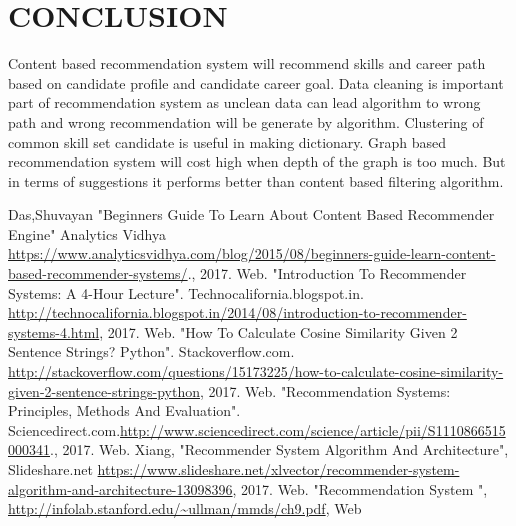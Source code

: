 \documentclass[journal, a4paper]{IEEEtran}
\begin{document}
\section{CONCLUSION}
Content based recommendation system will recommend skills and career path based on candidate profile and candidate career goal. Data cleaning is important part of recommendation system as unclean data can lead algorithm to wrong path and wrong recommendation will be generate by algorithm. Clustering of common skill set candidate is useful in making dictionary. Graph based recommendation system will cost high when depth of the graph is too much. But in terms of suggestions it performs better than content based filtering algorithm.
\begin{thebibliography}{9}
	Das,Shuvayan "Beginners Guide To Learn About Content Based Recommender Engine" Analytics Vidhya \url{https://www.analyticsvidhya.com/blog/2015/08/beginners-guide-learn-content-based-recommender-systems/}., 2017. Web. 
	"Introduction To Recommender Systems: A 4-Hour Lecture". Technocalifornia.blogspot.in. \url{http://technocalifornia.blogspot.in/2014/08/introduction-to-recommender-systems-4.html}, 2017. Web. 	
	"How To Calculate Cosine Similarity Given 2 Sentence Strings? Python". Stackoverflow.com. \url{http://stackoverflow.com/questions/15173225/how-to-calculate-cosine-similarity-given-2-sentence-strings-python}, 2017. Web. 
"Recommendation Systems: Principles, Methods And Evaluation". Sciencedirect.com.\url{http://www.sciencedirect.com/science/article/pii/S1110866515000341}., 2017. Web. 
Xiang, "Recommender System Algorithm And Architecture", Slideshare.net \url{https://www.slideshare.net/xlvector/recommender-system-algorithm-and-architecture-13098396}, 2017. Web. 
	"Recommendation System ", \url{http://infolab.stanford.edu/~ullman/mmds/ch9.pdf}, Web		
\end{thebibliography}

\end{document}
